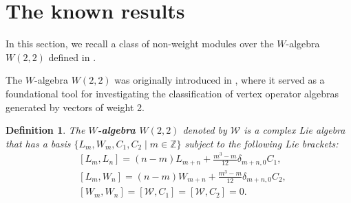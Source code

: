 \documentclass[a4paper]{amsart}
\numberwithin{equation}{section}
\newtheorem{definition}[theorem]{Definition}
\begin{document}
\section{The known results}
In this section, we recall a class of non-weight modules over the $W$-algebra $W(2,2)$ defined in \cite{CG17}.

The 
$W$-algebra $W(2,2)$ was originally introduced in \cite{ZD}, where it served as a foundational tool for investigating the classification of vertex operator algebras generated by vectors of weight 2.
    \begin{definition}
The	{\bf  $W$-algebra $W(2,2)$} denoted by $\mathcal{W}$ is a complex Lie algebra that has a basis $\Big\{L_{m},W_{m},C_{1},C_{2}\mid m\in \mathbb{Z}\Big\}$ subject to the following Lie brackets:
	\begin{align*}
		&[L_{m},L_{n}]=(n-m)L_{m+n}+\frac{m^{3}-m}{12}\delta_{m+n,0}C_{1},\\
		&[L_{m},W_{n}]=(n-m)W_{m+n}+\frac{m^{3}-m}{12}\delta_{m+n,0}C_{2},\\
	&[W_{m},W_{n}]=[\mathcal{W},C_1]=[\mathcal{W},C_2]=0.
	\end{align*}
      \end{definition}
 
\end{document}
